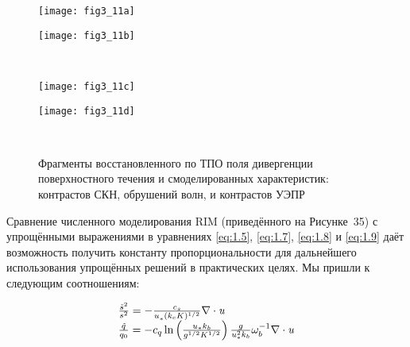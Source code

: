\begin{figure}[H]
   	\centering
	\begin{minipage}{.47\textwidth}
	    \subcaptionbox{\label{fig:3.11a}}
		{\texttt{[image: fig3\_11a]}}
	\end{minipage}
	\hfill
	\begin{minipage}{.47\textwidth}
	    \subcaptionbox{\label{fig:3.11b}}
		{\texttt{[image: fig3\_11b]}}
	\end{minipage}
	\\
	\begin{minipage}{.47\textwidth}
	    \subcaptionbox{\label{fig:3.11c}}
		{\texttt{[image: fig3\_11c]}}
	\end{minipage}
	\hfill
	\begin{minipage}{.47\textwidth}
	    \subcaptionbox{\label{fig:3.11d}}
		{\texttt{[image: fig3\_11d]}}
	\end{minipage}
    \\
    \caption{Фрагменты восстановленного по ТПО поля дивергенции поверхностного течения и смоделированных характеристик: контрастов СКН, обрушений волн, и контрастов УЭПР}
    \label{fig:3.11}
\end{figure}


Сравнение численного моделирования RIM (приведённого на Рисунке~35) с упрощёнными выражениями в уравнениях \eqref{eq:1.5}, \eqref{eq:1.7}, \eqref{eq:1.8} и \eqref{eq:1.9} даёт возможность получить константу пропорциональности для дальнейшего использования упрощённых решений в практических целях. Мы пришли к следующим соотношениям:



\begin{equation} \label{eq:3.11)} \begin{array}{l} {\frac{\tilde{s}^{2} }{s^{2} } =-\frac{c_{s} }{u_{*}^{} (k_{c} K)^{1/2} } \nabla \cdot {\it u}} \\ {\frac{\tilde{q}_{} }{q_{0} } =-c_{q} \ln \left(\frac{u_{*} k_{b} }{g^{1/2} K^{1/2} } \right)\frac{g}{u_{*}^{2} k_{b} } \omega _{b}^{-1} \nabla \cdot {\it u}} \end{array} \end{equation} 



